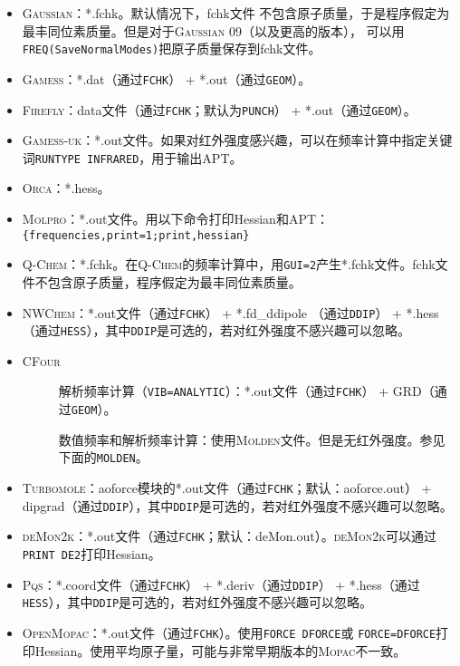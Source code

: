 \documentclass[12pt,a4paper,openany,twoside,cap]{ctexbook}
\begin{document}
\begin{itemize}
\item \textsc{Gaussian}：*.fchk。默认情况下，fchk文件 不包含原子质量，于是程序假定为最丰同位素质量。但是对于\textsc{Gaussian} 09（以及更高的版本），
可以用\texttt{FREQ(SaveNormalModes)}把原子质量保存到fchk文件。
\item \textsc{Gamess}：*.dat（通过\verb|FCHK|） + *.out（通过\verb|GEOM|）。
\item \textsc{Firefly}：data文件（通过\verb|FCHK|；默认为\verb|PUNCH|） + *.out（通过\verb|GEOM|）。
\item \textsc{Gamess-uk}：*.out文件。如果对红外强度感兴趣，可以在频率计算中指定关键词\texttt{RUNTYPE INFRARED}，用于输出APT。
\item \textsc{Orca}：*.hess。
\item \textsc{Molpro}：*.out文件。用以下命令打印Hessian和APT： \\
\verb|{frequencies,print=1;print,hessian}|
\item \textsc{Q-Chem}：*.fchk。在\textsc{Q-Chem}的频率计算中，用\texttt{GUI=2}产生*.fchk文件。fchk文件不包含原子质量，程序假定为最丰同位素质量。
\item \textsc{NWChem}：*.out文件（通过\verb|FCHK|） + *.fd{\_}ddipole （通过\verb|DDIP|） +
*.hess （通过\verb|HESS|），其中\verb|DDIP|是可选的，若对红外强度不感兴趣可以忽略。
\item \textsc{CFour}
  \begin{description}
  \item[ ]解析频率计算（\texttt{VIB=ANALYTIC}）：*.out文件（通过\verb|FCHK|） + GRD（通过\verb|GEOM|）。
  \item[ ]数值频率和解析频率计算：使用\textsc{Molden}文件。但是无红外强度。参见下面的\texttt{MOLDEN}。
  \end{description}
\item \textsc{Turbomole}：aoforce模块的*.out文件（通过\verb|FCHK|；默认：aoforce.out） +
dipgrad（通过\verb|DDIP|），其中\verb|DDIP|是可选的，若对红外强度不感兴趣可以忽略。
\item \textsc{deMon2k}：*.out文件（通过\verb|FCHK|；默认：deMon.out）。\textsc{deMon2k}可以通过\texttt{PRINT DE2}打印Hessian。
\item \textsc{Pqs}：*.coord文件（通过\verb|FCHK|） + *.deriv（通过\verb|DDIP|） + *.hess（通过\verb|HESS|），其中\verb|DDIP|是可选的，若对红外强度不感兴趣可以忽略。
\item \textsc{OpenMopac}：*.out文件（通过\verb|FCHK|）。使用\texttt{FORCE DFORCE}或
\texttt{FORCE=DFORCE}打印Hessian。使用平均原子量，可能与非常早期版本的\textsc{Mopac}不一致。

\end{itemize}
\end{document}
